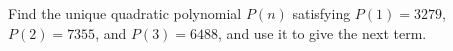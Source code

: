 Find the unique quadratic polynomial $P(n)$ satisfying $P(1)=3279$, $P(2)=7355$, and $P(3)=6488$, and use it to give the next term.
